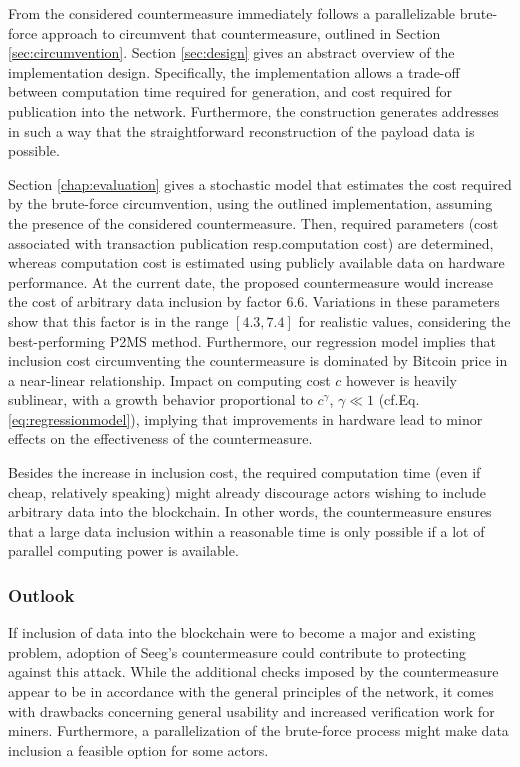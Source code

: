 \documentclass[a4paper,11pt,titlepage]{scrbook}
\begin{document}
From the considered countermeasure immediately follows a parallelizable brute-force approach to circumvent that countermeasure, outlined in Section \ref{sec:circumvention}. Section \ref{sec:design} gives an abstract overview of the implementation design.
Specifically, the implementation allows a trade-off between computation time required for generation, and cost required for publication into the network.
Furthermore, the construction generates addresses in such a way that the straightforward reconstruction of the payload data is possible.

Section \ref{chap:evaluation} gives a stochastic model that estimates the cost required by the brute-force circumvention, using the outlined implementation, assuming the presence of the considered countermeasure.
Then, required parameters (cost associated with transaction publication resp.\@ computation cost) are determined, whereas computation cost is estimated using publicly available data on hardware performance.
At the current date, the proposed countermeasure would increase the cost of arbitrary data inclusion by factor \num{6.6}.
Variations in these parameters show that this factor is in the range $[\num{4.3}, \num{7.4}]$ for realistic values, considering the best-performing P2MS method.
Furthermore, our regression model implies that inclusion cost circumventing the countermeasure is dominated by Bitcoin price in a near-linear relationship.
Impact on computing cost $c$ however is heavily sublinear, with a growth behavior proportional to $c^\gamma$, $\gamma \ll 1$ (cf.\@ Eq.\@ \ref{eq:regressionmodel}), implying that improvements in hardware lead to minor effects on the effectiveness of the countermeasure.

Besides the increase in inclusion cost, the required computation time (even if cheap, relatively speaking) might already discourage actors wishing to include arbitrary data into the blockchain.
In other words, the countermeasure ensures that a large data inclusion within a reasonable time is only possible if a lot of parallel computing power is available.

\subsubsection*{Outlook}

If inclusion of data into the blockchain were to become a major and existing problem, adoption of Seeg's countermeasure could contribute to protecting against this attack.
While the additional checks imposed by the countermeasure appear to be in accordance with the general principles of the network, it comes with drawbacks concerning general usability and increased verification work for miners.
Furthermore, a parallelization of the brute-force process might make data inclusion a feasible option for some actors.
\end{document}

